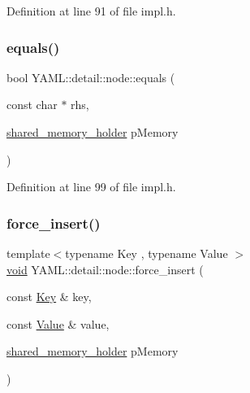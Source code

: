 Definition at line 91 of file impl.\+h.

\mbox{\label{class_y_a_m_l_1_1detail_1_1node_ab37848e6a257a7df5d36d5e078cc3516}} 
\subsubsection{\texorpdfstring{equals()}{equals()}\hspace{0.1cm}{\footnotesize\ttfamily [2/2]}}
{\footnotesize\ttfamily bool Y\+A\+M\+L\+::detail\+::node\+::equals (\begin{DoxyParamCaption}\item[{const char $\ast$}]{rhs,  }\item[{\mbox{\hyperlink{namespace_y_a_m_l_1_1detail_a228c4b3b6ba1058b474d40afc218e21d}{shared\+\_\+memory\+\_\+holder}}}]{p\+Memory }\end{DoxyParamCaption})\hspace{0.3cm}{\ttfamily [inline]}}



Definition at line 99 of file impl.\+h.

\mbox{\label{class_y_a_m_l_1_1detail_1_1node_a35f641db9ee6d3cae39350f0923afd4d}} 
\subsubsection{\texorpdfstring{force\_insert()}{force\_insert()}}
{\footnotesize\ttfamily template$<$typename Key , typename Value $>$ \\
\mbox{\hyperlink{glad_8h_a950fc91edb4504f62f1c577bf4727c29}{void}} Y\+A\+M\+L\+::detail\+::node\+::force\+\_\+insert (\begin{DoxyParamCaption}\item[{const \mbox{\hyperlink{namespace_y_a_m_l_a67c320aa50d3de7ecba1d0b8775dd684a1af533fc24b0311b8c4d5ac2870283aa}{Key}} \&}]{key,  }\item[{const \mbox{\hyperlink{namespace_y_a_m_l_a67c320aa50d3de7ecba1d0b8775dd684a0d29a86853d6a9cfe0241ab7ea8da97c}{Value}} \&}]{value,  }\item[{\mbox{\hyperlink{namespace_y_a_m_l_1_1detail_a228c4b3b6ba1058b474d40afc218e21d}{shared\+\_\+memory\+\_\+holder}}}]{p\+Memory }\end{DoxyParamCaption})\hspace{0.3cm}{\ttfamily [inline]}}



